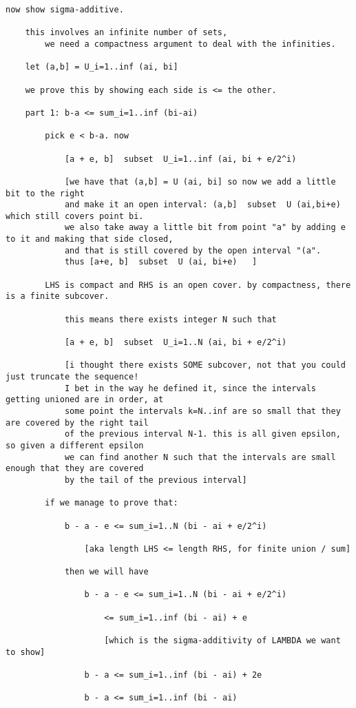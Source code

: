 \documentclass{article}
\begin{document}
\begin{flushleft}
\begin{verbatim}
now show sigma-additive. 
	
	this involves an infinite number of sets, 
		we need a compactness argument to deal with the infinities.
		
	let (a,b] = U_i=1..inf (ai, bi]
	
	we prove this by showing each side is <= the other.
	
	part 1: b-a <= sum_i=1..inf (bi-ai)
	
		pick e < b-a. now
	
			[a + e, b]  subset  U_i=1..inf (ai, bi + e/2^i)
			
			[we have that (a,b] = U (ai, bi] so now we add a little bit to the right
			and make it an open interval: (a,b]  subset  U (ai,bi+e) which still covers point bi.
			we also take away a little bit from point "a" by adding e to it and making that side closed,
			and that is still covered by the open interval "(a". 
			thus [a+e, b]  subset  U (ai, bi+e)   ]
		
		LHS is compact and RHS is an open cover. by compactness, there is a finite subcover.
		
			this means there exists integer N such that 
		
			[a + e, b]  subset  U_i=1..N (ai, bi + e/2^i)

			[i thought there exists SOME subcover, not that you could just truncate the sequence!
			I bet in the way he defined it, since the intervals getting unioned are in order, at 
			some point the intervals k=N..inf are so small that they are covered by the right tail
			of the previous interval N-1. this is all given epsilon, so given a different epsilon 
			we can find another N such that the intervals are small enough that they are covered 
			by the tail of the previous interval]
			
		if we manage to prove that:
		
			b - a - e <= sum_i=1..N (bi - ai + e/2^i)
				
				[aka length LHS <= length RHS, for finite union / sum]
				
			then we will have
		
				b - a - e <= sum_i=1..N (bi - ai + e/2^i) 
				
					<= sum_i=1..inf (bi - ai) + e
			
					[which is the sigma-additivity of LAMBDA we want to show]
				
				b - a <= sum_i=1..inf (bi - ai) + 2e
			
				b - a <= sum_i=1..inf (bi - ai) 
		

\end{verbatim}
\end{flushleft}
\end{document}
